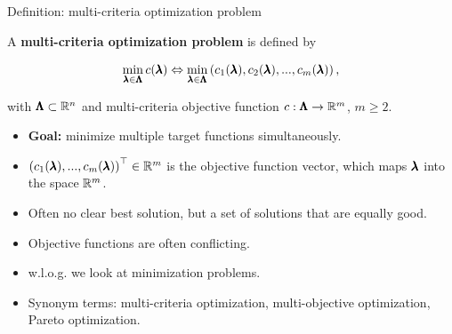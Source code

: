 \begin{frame}{Definition: multi-criteria optimization problem}

A \textbf{multi-criteria optimization problem} is defined by

$$
\min_{\pmb{\lambda} \in \pmb{\Lambda}}  c(\pmb{\lambda}) \Leftrightarrow \min_{\pmb{\lambda} \in \pmb{\Lambda}} \left(c_1(\pmb{\lambda}), c_2(\pmb{\lambda}), ..., c_m(\pmb{\lambda})\right),
$$

with $\pmb{\Lambda} \subset \mathbb{R}^n$ and multi-criteria objective function $c: \pmb{\Lambda} \to \mathbb{R}^m$, $m \ge 2$.

\begin{itemize}
\item \textbf{Goal:} minimize multiple target functions simultaneously.
\item $\left(c_1(\pmb{\lambda}), ..., c_m(\pmb{\lambda})\right)^\top \in \mathbb{R}^m$ is the objective function vector, which maps $\pmb{\lambda}$ into the space $\mathbb{R}^m$.
\item Often no clear best solution, but a set of solutions that are equally good.
\item Objective functions are often conflicting.
\item w.l.o.g. we look at minimization problems.
\item Synonym terms: multi-criteria optimization, multi-objective optimization, Pareto optimization.
\end{itemize}

\end{frame}

